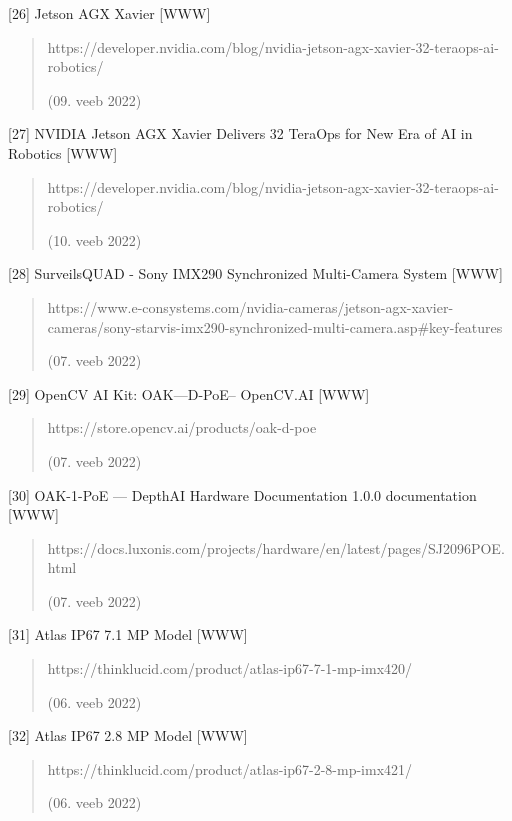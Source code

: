 \documentclass[12pt,a4paper]{report}
\begin{document}
{[}26{]} Jetson AGX Xavier {[}WWW{]}

\begin{quote}
https://developer.nvidia.com/blog/nvidia-jetson-agx-xavier-32-teraops-ai-robotics/

(09. veeb 2022)
\end{quote}

{[}27{]} NVIDIA Jetson AGX Xavier Delivers 32 TeraOps for New Era of AI in Robotics {[}WWW{]}

\begin{quote}
https://developer.nvidia.com/blog/nvidia-jetson-agx-xavier-32-teraops-ai-robotics/

(10. veeb 2022)
\end{quote}

{[}28{]} SurveilsQUAD - Sony IMX290 Synchronized Multi-Camera System {[}WWW{]}

\begin{quote}
https://www.e-consystems.com/nvidia-cameras/jetson-agx-xavier-cameras/sony-starvis-imx290-synchronized-multi-camera.asp\#key-features

(07. veeb 2022)
\end{quote}

{[}29{]} OpenCV AI Kit: OAK---D-PoE-- OpenCV.AI {[}WWW{]}

\begin{quote}
https://store.opencv.ai/products/oak-d-poe

(07. veeb 2022)
\end{quote}

{[}30{]} OAK-1-PoE --- DepthAI Hardware Documentation 1.0.0 documentation {[}WWW{]}

\begin{quote}
https://docs.luxonis.com/projects/hardware/en/latest/pages/SJ2096POE.html

(07. veeb 2022)
\end{quote}

{[}31{]} Atlas IP67 7.1 MP Model {[}WWW{]}

\begin{quote}
https://thinklucid.com/product/atlas-ip67-7-1-mp-imx420/

(06. veeb 2022)
\end{quote}

{[}32{]} Atlas IP67 2.8 MP Model {[}WWW{]}

\begin{quote}
https://thinklucid.com/product/atlas-ip67-2-8-mp-imx421/

(06. veeb 2022)
\end{quote}
\end{document}
